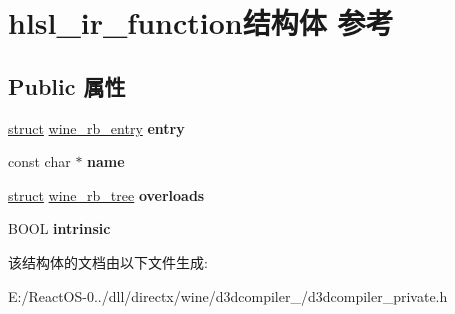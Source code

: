 \hypertarget{structhlsl__ir__function}{}\section{hlsl\+\_\+ir\+\_\+function结构体 参考}
\label{structhlsl__ir__function}
\subsection*{Public 属性}
\begin{DoxyCompactItemize}
\item 
\mbox{\label{structhlsl__ir__function_af9e9d77cad0d789578403a76e62cf18a}} 
\hyperlink{interfacestruct}{struct} \hyperlink{structwine__rb__entry}{wine\+\_\+rb\+\_\+entry} {\bfseries entry}
\item 
\mbox{\label{structhlsl__ir__function_a0d605312bfccb7d559f6cedd4ea5a469}} 
const char $\ast$ {\bfseries name}
\item 
\mbox{\label{structhlsl__ir__function_a65358565374d552d0c72b84b5e30b262}} 
\hyperlink{interfacestruct}{struct} \hyperlink{structwine__rb__tree}{wine\+\_\+rb\+\_\+tree} {\bfseries overloads}
\item 
\mbox{\label{structhlsl__ir__function_aa17451b1710ab8329276ec421bba79cd}} 
B\+O\+OL {\bfseries intrinsic}
\end{DoxyCompactItemize}


该结构体的文档由以下文件生成\+:\begin{DoxyCompactItemize}
\item 
E\+:/\+React\+O\+S-\/0../dll/directx/wine/d3dcompiler\+\_/d3dcompiler\+\_\+private.\+h\end{DoxyCompactItemize}
